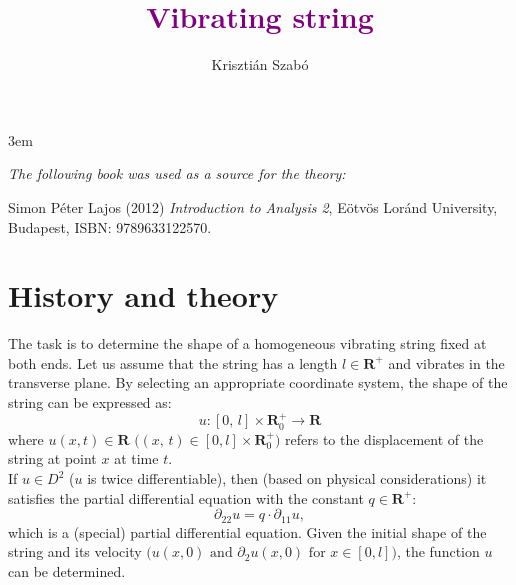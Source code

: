 \documentclass[12pt]{article}
\title{\textcolor{purple}{\Huge\textbf{Vibrating string}}}
\author{Krisztián Szabó}
\begin{document}
	\emergencystretch 3em
	\maketitle
	\begin{center}
		\textit{The following book was used as a source for the theory:}
	\end{center}
	
\begin{thebibliography}{9}
	Simon Péter Lajos (2012) \emph{Introduction to Analysis 2}, Eötvös Loránd University, Budapest, ISBN: 9789633122570.
\end{thebibliography}

\section{History and theory}

The task is to determine the shape of a homogeneous vibrating string fixed at both ends. Let us assume that the string has a length $l \in \mathbf{R}^+$ and vibrates in the transverse plane. By selecting an appropriate coordinate system, the shape of the string can be expressed as:
$$
u : [0, \, l] \times \mathbf{R}_0^+ \to \mathbf{R}
$$
where $u(x, t) \in \mathbf{R} \, \, \big((x, \, t) \in [0, l] \times \mathbf{R}_0^+\big)$ refers to the displacement of the string at point $x$ at time $t$.\\

If $u \in D^2$ ($u$ is twice differentiable), then (based on physical considerations) it satisfies the partial differential equation with the constant $q \in \mathbf{R}^+$:
$$
\partial_{22} u = q \cdot \partial_{11} u,
$$
which is a (special) partial differential equation. Given the initial shape of the string and its velocity $\big(u(x, 0) \text{ and } \partial_2 u(x, 0) \text{ for }  x \in [0, l] \big)$, the function $u$ can be determined.\\
\end{document}
